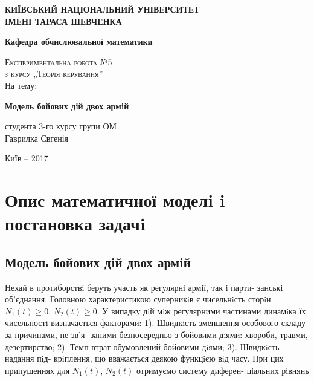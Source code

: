\documentclass[fontsize=14pt,DIV=1,a4paper]{scrartcl}
\begin{document}
\begin{titlepage}
		\begin{center}
			\large
			\textbf{КИЇВСЬКИЙ НАЦІОНАЛЬНИЙ УНІВЕРСИТЕТ \\
			ІМЕНІ ТАРАСА ШЕВЧЕНКА}

			\textbf{Кафедра обчислювальної математики}
			
			\vspace{6.0cm}

			\textsc{
			Експериментальна робота №5 \\ з курсу „Теорiя керування”}\\
			На тему:

			\textbf{ Модель бойових дiй двох армiй}
			\bigskip
		\end{center}
		\vfill

		\hfill
		\begin{minipage}{0.45\textwidth}
			студента 3-го курсу групи ОМ \\
			Гаврилка Євгенія
		\end{minipage}%
		\vfill

		\begin{center}
			Київ – 2017
		\end{center}
	\end{titlepage}
	
	\tableofcontents

\newpage
\section{Опис математичної моделi i постановка задачi}
\subsection{Модель бойових дiй двох армiй}
Нехай в протиборствi беруть участь як регулярнi армiї, так i парти-
занськi об’єднання. Головною характеристикою суперникiв є чисельнiсть
сторiн $N_1(t) \geq 0$, $N_2(t) \geq 0$. У випадку дiй мiж регулярними частинами
динамiка їх чисельностi визначається факторами:
1). Швидкiсть зменшення особового складу за причинами, не зв’я-
заними безпосередньо з бойовими дiями: хвороби, травми, дезертирство;
2). Темп втрат обумовлений бойовими дiями; 3). Швидкiсть надання пiд-
крiплення, що вважається деякою функцiєю вiд часу.
При цих припущеннях для $N_1 (t)$, $N_2 (t)$ отримуємо систему диферен-
цiальних рiвнянь
\end{document}
